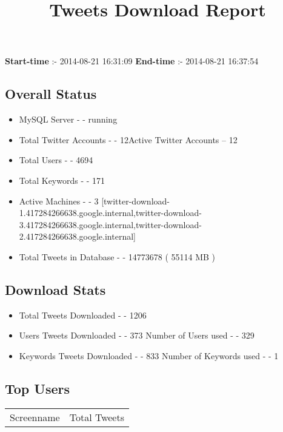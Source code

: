 \documentclass{article}\usepackage[T1]{fontenc}
\begin{document}
\title{\textbf{Tweets Download Report}}
               \date{}
                \maketitle
               \centerline{\textbf{Start-time} :- 2014-08-21 16:31:09 \hspace{40pt} \textbf{End-time} :- 2014-08-21 16:37:54}               \subsection*{Overall Status}                \begin{itemize}                \item MySQL Server - - running               \item Total Twitter Accounts - - 12\newline Active Twitter Accounts -- 12               \item Total Users - - 4694               \item Total Keywords - - 171               \item Active Machines - - 3 [twitter-download-1.417284266638.google.internal,twitter-download-3.417284266638.google.internal,twitter-download-2.417284266638.google.internal]               \item Total Tweets in Database - - 14773678 ( 55114 MB )               \end{itemize}               \subsection*{Download Stats}                \begin{itemize}                \item Total Tweets Downloaded - - 1206               \item Users Tweets Downloaded - - 373 \newline Number of Users used - - 329               \item Keywords Tweets Downloaded - - 833 \newline Number of Keywords used - - 1              \end{itemize}              \subsection*{Top Users}\begin{tabular}{|c|c|}         \hline         Screenname & Total Tweets \\ 

\end{tabular}
\end{document}
